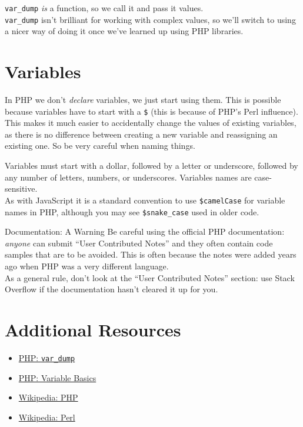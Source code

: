 \texttt{var\_dump} \textit{is} a function, so we call it and pass it values.
\\

\texttt{var\_dump} isn't brilliant for working with complex values, so we'll switch to using a nicer way of doing it once we've learned up using PHP libraries.


\section{Variables}

In PHP we don't \textit{declare} variables, we just start using them. This is possible because variables have to start with a \texttt{\$} (this is because of PHP's Perl influence).
\\

This makes it much easier to accidentally change the values of existing variables, as there is no difference between creating a new variable and reassigning an existing one. So be very careful when naming things.


Variables must start with a dollar, followed by a letter or underscore, followed by any number of letters, numbers, or underscores. Variables names are case-sensitive.
\\

As with JavaScript it is a standard convention to use \texttt{\$camelCase} for variable names in PHP, although you may see \texttt{\$snake\_case} used in older code.


\begin{infobox}{Documentation: A Warning}
    Be careful using the official PHP documentation: \textit{anyone} can submit ``User Contributed Notes'' and they often contain code samples that are to be avoided. This is often because the notes were added years ago when PHP was a very different language.
    \\

    As a general rule, don't look at the ``User Contributed Notes'' section: use Stack Overflow if the documentation hasn't cleared it up for you.
\end{infobox}



\section{Additional Resources}

\begin{itemize}[leftmargin=*]
    \item \href{https://www.php.net/manual/en/function.var-dump.php}{PHP: \texttt{var\_dump}}
    \item \href{http://php.net/manual/en/language.variables.basics.php}{PHP: Variable Basics}
    \item \href{https://en.wikipedia.org/wiki/PHP}{Wikipedia: PHP}
    \item \href{https://en.wikipedia.org/wiki/Perl}{Wikipedia: Perl}
\end{itemize}
